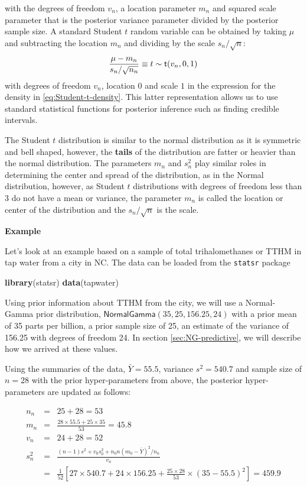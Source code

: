 \documentclass[]{book}
\newenvironment{Shaded}{\begin{snugshade}}{\end{snugshade}}
\newcommand{\KeywordTok}[1]{\textcolor[rgb]{0.13,0.29,0.53}{\textbf{#1}}}
\newcommand{\NormalTok}[1]{#1}
\theoremstyle{definition}
\theoremstyle{definition}
\theoremstyle{definition}
\theoremstyle{remark}
\begin{document}
with the degrees of freedom \(v_n\), a location parameter \(m_n\) and
squared scale parameter that is the posterior variance parameter divided
by the posterior sample size. A standard Student \(t\) random variable
can be obtained by taking \(\mu\) and subtracting the location \(m_n\)
and dividing by the scale \(s_n/\sqrt{n}\):
\[ \frac{\mu - m_n}{s_n/\sqrt{n_n}} \equiv t \sim \textsf{t}(v_n, 0 , 1)  \]
with degrees of freedom \(v_n\), location \(0\) and scale \(1\) in the
expression for the density in \eqref{eq:Student-t-density}. This latter
representation allows us to use standard statistical functions for
posterior inference such as finding credible intervals.

The Student \(t\) distribution is similar to the normal distribution as
it is symmetric and bell shaped, however, the \textbf{tails} of the
distribution are fatter or heavier than the normal distribution. The
parameters \(m_n\) and \(s^2_n\) play similar roles in determining the
center and spread of the distribution, as in the Normal distribution,
however, as Student \(t\) distributions with degrees of freedom less
than 3 do not have a mean or variance, the parameter \(m_n\) is called
the location or center of the distribution and the \(s_n/\sqrt{n}\) is
the scale.

\textbf{Example}

Let's look at an example based on a sample of total trihalomethanes or
TTHM in tap water from a city in NC. The data can be loaded from the
\texttt{statsr} package

\begin{Shaded}
\begin{Highlighting}[]
\KeywordTok{library}\NormalTok{(statsr)}
\KeywordTok{data}\NormalTok{(tapwater)}
\end{Highlighting}
\end{Shaded}

Using prior information about TTHM from the city, we will use a
Normal-Gamma prior distribution,
\(\textsf{NormalGamma}(35, 25, 156.25, 24)\) with a prior mean of 35
parts per billion, a prior sample size of 25, an estimate of the
variance of 156.25 with degrees of freedom 24. In section
\ref{sec:NG-predictive}, we will describe how we arrived at these
values.

Using the summaries of the data, \(\bar{Y} = 55.5\), variance
\(s^2 = 540.7\) and sample size of \(n = 28\) with the prior
hyper-parameters from above, the posterior hyper-parameters are updated
as follows:

\begin{eqnarray*}
n_n & = &  25 +  28 = 53\\
m_n  & = & \frac{28 \times55.5 + 25 \times35}{53} = 45.8  \\
v_n & = & 24 + 28 = 52  \\
s^2_n & = & \frac{(n-1) s^2 + v_0 s^2_0 + n_0 n (m_0 - \bar{Y})^2 /n_n }{v_n}  \\
  & = & \frac{1}{52}
     \left[27 \times 540.7 +
          24 \times 156.25  +
          \frac{25 \times 28}{53} \times (35 - 55.5)^2
\right] = 459.9  \\
\end{eqnarray*}
\end{document}
